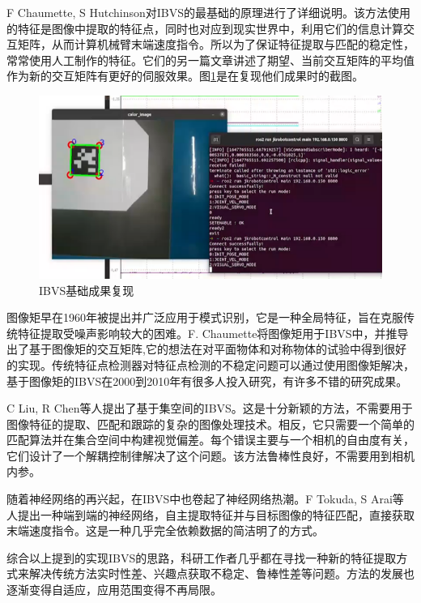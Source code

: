 \documentclass[fontset=fandol,type=bachelor,campus=harbin,bsmainpagenumberline=true]{hithesisbook}
\begin{document}
F Chaumette, S Hutchinson对IBVS的最基础的原理进行了详细说明\cite{chaumette2006visual}。该方法使用的特征是图像中提取的特征点，同时也对应到现实世界中，利用它们的信息计算交互矩阵，从而计算机械臂末端速度指令。所以为了保证特征提取与匹配的稳定性，常常使用人工制作的特征。它们的另一篇文章讲述了期望、当前交互矩阵的平均值作为新的交互矩阵有更好的伺服效果\cite{chaumette2007visual}。图\ref{IBVS基础复现}是在复现他们成果时的截图。
\begin{figure}[htbp]
\centering
\includegraphics[scale=0.5]{chapter1/IBVS基础成果复现}
\caption{IBVS基础成果复现}
\label{IBVS基础复现}
\end{figure}


图像矩早在1960年被提出并广泛应用于模式识别，它是一种全局特征，旨在克服传统特征提取受噪声影响较大的困难。F. Chaumette将图像矩用于IBVS中，并推导出了基于图像矩的交互矩阵\cite{chaumette2004image},它的想法在对平面物体和对称物体的试验中得到很好的实现。传统特征点检测器对特征点检测的不稳定问题可以通过使用图像矩解决，基于图像矩的IBVS在2000到2010年有很多人投入研究，有许多不错的研究成果。


C Liu, R Chen等人提出了基于集空间的IBVS\cite{liu2017set}。这是十分新颖的方法，不需要用于图像特征的提取、匹配和跟踪的复杂的图像处理技术。相反，它只需要一个简单的匹配算法并在集合空间中构建视觉偏差。每个错误主要与一个相机的自由度有关，它们设计了一个解耦控制律解决了这个问题。该方法鲁棒性良好，不需要用到相机内参。


随着神经网络的再兴起，在IBVS中也卷起了神经网络热潮。F Tokuda, S Arai等人提出一种端到端的神经网络\cite{tokuda2021convolutional}，自主提取特征并与目标图像的特征匹配，直接获取末端速度指令。这是一种几乎完全依赖数据的简洁明了的方式。


综合以上提到的实现IBVS的思路，科研工作者几乎都在寻找一种新的特征提取方式来解决传统方法实时性差、兴趣点获取不稳定、鲁棒性差等问题。方法的发展也逐渐变得自适应，应用范围变得不再局限。
\end{document}
